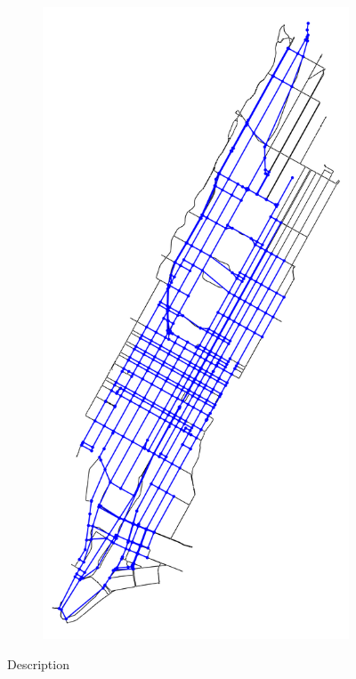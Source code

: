 \begin{figure}[tbh]
\begin{subfigure}[b]{0.32\textwidth}
		\caption{}
		\label{fig:nyc_simplified_info}
	\end{subfigure}
	\begin{subfigure}[b]{0.32\textwidth}
		\centering
		\includegraphics[width=\textwidth]{assets/img/new_york_simplified_roads.png}
		\caption{}
		\label{fig:nyc_simplified_roads}
	\end{subfigure}
	
	\caption[Title In the TOC]{Description }
	\label{fig:nyc_rn}
\end{figure}


